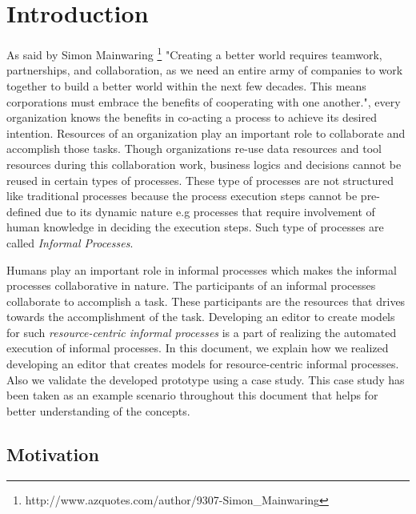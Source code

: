 \chapter{Introduction}
\label{chap:introduction}

As said by Simon Mainwaring  \footnote{http://www.azquotes.com/author/9307-Simon\_Mainwaring}  "Creating a better world requires teamwork, partnerships, and collaboration, as we need an entire army of companies to work together to build a better world within the next few decades. This means corporations must embrace the benefits of cooperating with one another.", every organization knows the benefits in co-acting a process to achieve its desired intention. Resources of an organization play an important role to collaborate and accomplish those tasks. Though organizations re-use data resources and tool resources during this collaboration work, business logics and decisions cannot be reused in certain types of processes. These type of processes are not structured like traditional processes because the process execution steps cannot be pre-defined due to its dynamic nature e.g processes that require involvement of human knowledge in deciding the execution steps\cite{Sungur2014}. Such type of processes are called \textit{Informal Processes}.

Humans play an important role in informal processes which makes the informal processes collaborative in nature. The participants of an informal processes collaborate to accomplish a task. These participants are the resources that drives towards the accomplishment of the task.  Developing an editor to create models for such \textit{resource-centric informal processes} is a part of realizing the automated execution of informal processes. In this document, we explain how we realized developing an editor that creates models for resource-centric informal processes. Also we validate the developed prototype using a case study. This case study has been taken as an example scenario throughout this document that helps for better understanding of the concepts.




\section{Motivation}
\label{sec:motivation}

